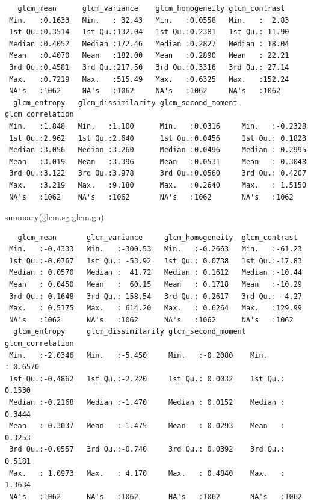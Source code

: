 \documentclass[
  letterpaper,
  DIV=11,
  numbers=noendperiod]{scrartcl}
\newenvironment{Shaded}{\begin{snugshade}}{\end{snugshade}}
\newcommand{\FunctionTok}[1]{\textcolor[rgb]{0.28,0.35,0.67}{#1}}
\newcommand{\NormalTok}[1]{\textcolor[rgb]{0.00,0.23,0.31}{#1}}
\newcommand{\SpecialCharTok}[1]{\textcolor[rgb]{0.37,0.37,0.37}{#1}}
\begin{document}
\begin{verbatim}
   glcm_mean      glcm_variance    glcm_homogeneity glcm_contrast   
 Min.   :0.1633   Min.   : 32.43   Min.   :0.0558   Min.   :  2.83  
 1st Qu.:0.3514   1st Qu.:132.04   1st Qu.:0.2381   1st Qu.: 11.90  
 Median :0.4052   Median :172.46   Median :0.2827   Median : 18.04  
 Mean   :0.4070   Mean   :182.00   Mean   :0.2890   Mean   : 22.21  
 3rd Qu.:0.4581   3rd Qu.:217.50   3rd Qu.:0.3316   3rd Qu.: 27.14  
 Max.   :0.7219   Max.   :515.49   Max.   :0.6325   Max.   :152.24  
 NA's   :1062     NA's   :1062     NA's   :1062     NA's   :1062    
  glcm_entropy   glcm_dissimilarity glcm_second_moment glcm_correlation 
 Min.   :1.848   Min.   :1.100      Min.   :0.0316     Min.   :-0.2328  
 1st Qu.:2.962   1st Qu.:2.640      1st Qu.:0.0456     1st Qu.: 0.1823  
 Median :3.056   Median :3.260      Median :0.0496     Median : 0.2995  
 Mean   :3.019   Mean   :3.396      Mean   :0.0531     Mean   : 0.3048  
 3rd Qu.:3.122   3rd Qu.:3.978      3rd Qu.:0.0560     3rd Qu.: 0.4207  
 Max.   :3.219   Max.   :9.180      Max.   :0.2640     Max.   : 1.5150  
 NA's   :1062    NA's   :1062       NA's   :1062       NA's   :1062     
\end{verbatim}

\begin{Shaded}
\begin{Highlighting}[]
\FunctionTok{summary}\NormalTok{(glcm.sg}\SpecialCharTok{{-}}\NormalTok{glcm.gn)}
\end{Highlighting}
\end{Shaded}

\begin{verbatim}
   glcm_mean       glcm_variance     glcm_homogeneity  glcm_contrast   
 Min.   :-0.4333   Min.   :-300.53   Min.   :-0.2663   Min.   :-61.23  
 1st Qu.:-0.0767   1st Qu.: -53.92   1st Qu.: 0.0738   1st Qu.:-17.83  
 Median : 0.0570   Median :  41.72   Median : 0.1612   Median :-10.44  
 Mean   : 0.0450   Mean   :  60.15   Mean   : 0.1718   Mean   :-10.29  
 3rd Qu.: 0.1648   3rd Qu.: 158.54   3rd Qu.: 0.2617   3rd Qu.: -4.27  
 Max.   : 0.5175   Max.   : 614.20   Max.   : 0.6264   Max.   :129.99  
 NA's   :1062      NA's   :1062      NA's   :1062      NA's   :1062    
  glcm_entropy     glcm_dissimilarity glcm_second_moment glcm_correlation 
 Min.   :-2.0346   Min.   :-5.450     Min.   :-0.2080    Min.   :-0.6570  
 1st Qu.:-0.4862   1st Qu.:-2.220     1st Qu.: 0.0032    1st Qu.: 0.1530  
 Median :-0.2168   Median :-1.470     Median : 0.0152    Median : 0.3444  
 Mean   :-0.3037   Mean   :-1.475     Mean   : 0.0293    Mean   : 0.3253  
 3rd Qu.:-0.0557   3rd Qu.:-0.740     3rd Qu.: 0.0392    3rd Qu.: 0.5181  
 Max.   : 1.0973   Max.   : 4.170     Max.   : 0.4840    Max.   : 1.3634  
 NA's   :1062      NA's   :1062       NA's   :1062       NA's   :1062     
\end{verbatim}
\end{document}
